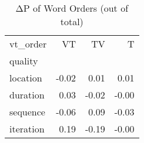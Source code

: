 \begin{table}[htbp!]
\centering
\caption{ΔP of Word Orders (out of total)}
\label{table:order_dp}
\begin{tabular}{lrrr}
\toprule
vt\_order &    VT &    TV &     T \\
quality   &       &       &       \\
\midrule
location  & -0.02 &  0.01 &  0.01 \\
duration  &  0.03 & -0.02 & -0.00 \\
sequence  & -0.06 &  0.09 & -0.03 \\
iteration &  0.19 & -0.19 & -0.00 \\
\bottomrule
\end{tabular}
\end{table}
